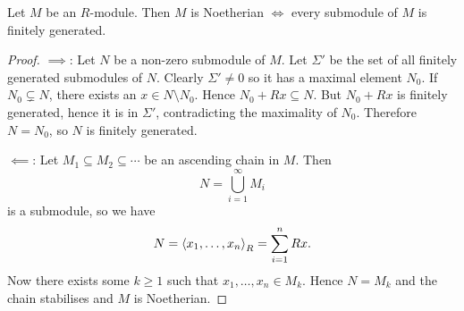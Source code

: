 \begin{prop}[3.2]
  Let $M$ be an $R$-module.
  Then $M$ is Noetherian $\iff$ every submodule of $M$ is finitely generated.
\end{prop}

\begin{proof}
  $\implies$:
  Let $N$ be a non-zero submodule of $M$.
  Let $\Sigma'$ be the set of all finitely generated submodules of $N$.
  Clearly $\Sigma' \neq 0$ so it has a maximal element $N_0$.
  If $N_0 \subsetneq N$, there exists an $x \in N \setminus N_0$.
  Hence $N_0 + Rx \subseteq N$.
  But $N_0 + Rx$ is finitely generated, hence it is in $\Sigma'$, contradicting the maximality of $N_0$.
  Therefore $N=N_0$, so $N$ is finitely generated.

  $\impliedby$:
  Let $M_1 \subseteq M_2 \subseteq \cdots$ be an ascending chain in $M$.
  Then
  \[ N = \bigcup_{i=1}^\infty M_i \]
  is a submodule, so we have
  \[ N = {\left\langle x_1,\ldots,x_n \right\rangle}_R = \sum_{i=1}^n Rx. \]
  Now there exists some $k \geq 1$ such that $x_1,\ldots,x_n \in M_k$.
  Hence $N=M_k$ and the chain stabilises and $M$ is Noetherian.
\end{proof}
